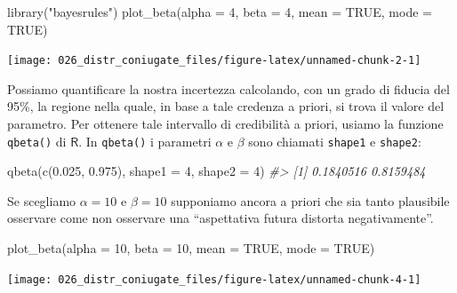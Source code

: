 \documentclass[
  11pt,
  italian,
  a4paper,
  extrafontsizes,onecolumn,openright
  ]{memoir}
\newenvironment{Shaded}{\begin{snugshade}}{\end{snugshade}}
\newcommand{\AttributeTok}[1]{\textcolor[rgb]{0.77,0.63,0.00}{#1}}
\newcommand{\CommentTok}[1]{\textcolor[rgb]{0.56,0.35,0.01}{\textit{#1}}}
\newcommand{\ConstantTok}[1]{\textcolor[rgb]{0.00,0.00,0.00}{#1}}
\newcommand{\DecValTok}[1]{\textcolor[rgb]{0.00,0.00,0.81}{#1}}
\newcommand{\FloatTok}[1]{\textcolor[rgb]{0.00,0.00,0.81}{#1}}
\newcommand{\FunctionTok}[1]{\textcolor[rgb]{0.00,0.00,0.00}{#1}}
\newcommand{\NormalTok}[1]{#1}
\newcommand{\StringTok}[1]{\textcolor[rgb]{0.31,0.60,0.02}{#1}}
\newcommand{\R}{\textsf{R}} %
\theoremstyle{definition}
\theoremstyle{definition}
\theoremstyle{definition}
\theoremstyle{definition}
\theoremstyle{remark}
\begin{document}
\begin{Shaded}
\begin{Highlighting}[]
\FunctionTok{library}\NormalTok{(}\StringTok{"bayesrules"}\NormalTok{)}
\FunctionTok{plot\_beta}\NormalTok{(}\AttributeTok{alpha =} \DecValTok{4}\NormalTok{, }\AttributeTok{beta =} \DecValTok{4}\NormalTok{, }\AttributeTok{mean =} \ConstantTok{TRUE}\NormalTok{, }\AttributeTok{mode =} \ConstantTok{TRUE}\NormalTok{)}
\end{Highlighting}
\end{Shaded}

\begin{center}\texttt{[image: 026\_distr\_coniugate\_files/figure-latex/unnamed-chunk-2-1]} \end{center}

Possiamo quantificare la nostra incertezza calcolando, con un grado di fiducia del 95\%, la regione nella quale, in base a tale credenza a priori, si trova il valore del parametro. Per ottenere tale intervallo di credibilità a priori, usiamo la funzione \texttt{qbeta()} di \(\R\). In \texttt{qbeta()} i parametri \(\alpha\) e \(\beta\) sono chiamati \texttt{shape1} e \texttt{shape2}:

\begin{Shaded}
\begin{Highlighting}[]
\FunctionTok{qbeta}\NormalTok{(}\FunctionTok{c}\NormalTok{(}\FloatTok{0.025}\NormalTok{, }\FloatTok{0.975}\NormalTok{), }\AttributeTok{shape1 =} \DecValTok{4}\NormalTok{, }\AttributeTok{shape2 =} \DecValTok{4}\NormalTok{)}
\CommentTok{\#\textgreater{} [1] 0.1840516 0.8159484}
\end{Highlighting}
\end{Shaded}

Se scegliamo \(\alpha=10\) e \(\beta=10\) supponiamo ancora a priori che sia tanto plausibile osservare come non osservare una ``aspettativa futura distorta negativamente''.

\begin{Shaded}
\begin{Highlighting}[]
\FunctionTok{plot\_beta}\NormalTok{(}\AttributeTok{alpha =} \DecValTok{10}\NormalTok{, }\AttributeTok{beta =} \DecValTok{10}\NormalTok{, }\AttributeTok{mean =} \ConstantTok{TRUE}\NormalTok{, }\AttributeTok{mode =} \ConstantTok{TRUE}\NormalTok{)}
\end{Highlighting}
\end{Shaded}

\begin{center}\texttt{[image: 026\_distr\_coniugate\_files/figure-latex/unnamed-chunk-4-1]} \end{center}
\end{document}
